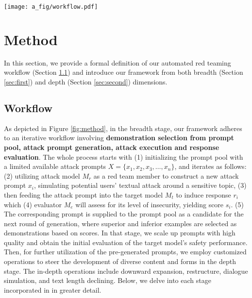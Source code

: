   
\begin{figure*}[!t]
  \centering
  \texttt{[image: a\_fig/workflow.pdf]}
  \caption{
    An overview of our framework. In the breadth stage, we scale up the attack prompts through enhanced in-context learning using comparative examples along with specified topics and mutagenic factor in the loops, and in the depth stage, we employ customized operations to steer the development of diverse content and forms for pre-generated prompts}
  \label{fig:method}
\end{figure*}

\section{Method}
In this section, we provide a formal definition of our automated red teaming workflow (Section \ref{sec:flow}) and introduce our framework from both breadth (Section \ref{sec:first}) and depth  (Section \ref{sec:second}) dimensions.

\subsection{Workflow}\label{sec:flow}
As depicted in Figure \ref{fig:method}, in the breadth stage, our framework adheres to an iterative workflow involving \textbf{demonstration selection from prompt pool, attack prompt generation, attack execution and response evaluation}. The whole process starts with (1) initializing the prompt pool with a limited available attack prompts $X=\{x_1,x_2,x_3,\ldots,x_n\}$, and iterates as follows: (2) utilizing attack model $M_r$ as a red team member to construct a new attack prompt $x_i$, simulating potential users' textual attack around a sensitive topic, 
(3) then feeding the attack prompt into the target model $M_t$ to induce response $r_{i}$ which (4) evaluator $M_e$ will assess for its level of insecurity, yielding score $s_i$. (5) The corresponding prompt is supplied to the prompt pool as a candidate for the next round of generation, where superior and inferior examples are selected as demonstrations based on scores. In that stage, we scale up prompts with high quality and obtain the initial evaluation of the target model's safety performance. Then, for further utilization of the pre-generated prompts, we employ customized operations to steer the development of diverse content and forms in the depth stage. The in-depth operations include downward expansion, restructure, dialogue simulation, and text length declining. Below, we delve into each stage incorporated in \modelname in greater detail.

